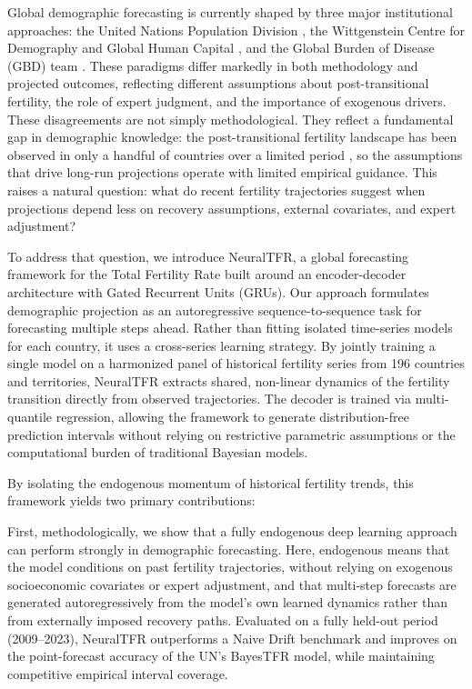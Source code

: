 \documentclass[12pt]{article}
\begin{document}
Global demographic forecasting is currently shaped by three major institutional approaches: the United Nations Population Division \citep{un2024wpp}, the Wittgenstein Centre for Demography and Global Human Capital \citep{kc2024updating}, and the Global Burden of Disease (GBD) team \citep{gbd2024global}. These paradigms differ markedly in both methodology and projected outcomes, reflecting different assumptions about post-transitional fertility, the role of expert judgment, and the importance of exogenous drivers. These disagreements are not simply methodological. They reflect a fundamental gap in demographic knowledge: the post-transitional fertility landscape has been observed in only a handful of countries over a limited period \citep{goujon2025}, so the assumptions that drive long-run projections operate with limited empirical guidance. This raises a natural question: what do recent fertility trajectories suggest when projections depend less on recovery assumptions, external covariates, and expert adjustment?

To address that question, we introduce NeuralTFR, a global forecasting framework for the Total Fertility Rate built around an encoder-decoder architecture with Gated Recurrent Units (GRUs). Our approach formulates demographic projection as an autoregressive sequence-to-sequence task for forecasting multiple steps ahead. Rather than fitting isolated time-series models for each country, it uses a cross-series learning strategy. By jointly training a single model on a harmonized panel of historical fertility series from 196 countries and territories, NeuralTFR extracts shared, non-linear dynamics of the fertility transition directly from observed trajectories. The decoder is trained via multi-quantile regression, allowing the framework to generate distribution-free prediction intervals without relying on restrictive parametric assumptions or the computational burden of traditional Bayesian models.

By isolating the endogenous momentum of historical fertility trends, this framework yields two primary contributions:

First, methodologically, we show that a fully endogenous deep learning approach can perform strongly in demographic forecasting. Here, endogenous means that the model conditions on past fertility trajectories, without relying on exogenous socioeconomic covariates or expert adjustment, and that multi-step forecasts are generated autoregressively from the model's own learned dynamics rather than from externally imposed recovery paths. Evaluated on a fully held-out period (2009--2023), NeuralTFR outperforms a Naive Drift benchmark and improves on the point-forecast accuracy of the UN's BayesTFR model, while maintaining competitive empirical interval coverage.
\end{document}
